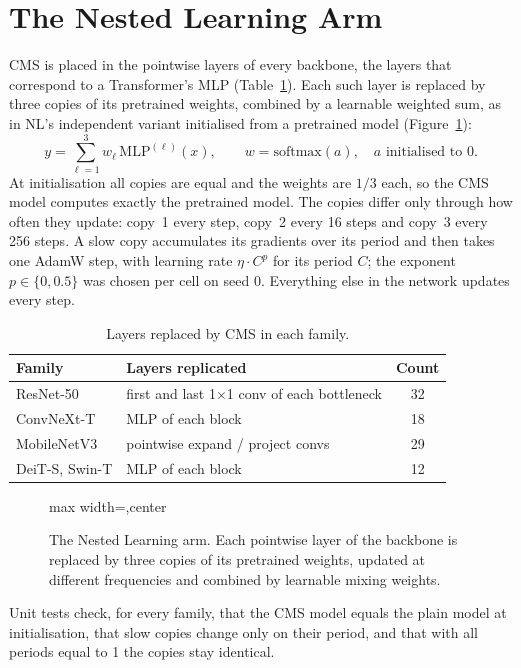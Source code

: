 \documentclass[12pt,a4paper]{report}
\newcommand{\diagram}[1]{\begin{adjustbox}{max width=\textwidth,center}\end{adjustbox}}
\begin{document}
\section{The Nested Learning Arm}\label{sec:cms}
CMS is placed in the pointwise layers of every backbone, the layers that correspond to a Transformer's MLP (Table~\ref{tab:cmslayers}). Each such layer is replaced by three copies of its pretrained weights, combined by a learnable weighted sum, as in NL's independent variant initialised from a pretrained model (Figure~\ref{fig:cmslayer}):
\begin{equation}
y = \sum_{\ell=1}^{3} w_\ell \, \mathrm{MLP}^{(\ell)}(x), \qquad w = \mathrm{softmax}(a), \quad a \text{ initialised to } 0.
\end{equation}
At initialisation all copies are equal and the weights are $1/3$ each, so the CMS model computes exactly the pretrained model. The copies differ only through how often they update: copy~1 every step, copy~2 every 16 steps and copy~3 every 256 steps. A slow copy accumulates its gradients over its period and then takes one AdamW step, with learning rate $\eta \cdot C^{p}$ for its period $C$; the exponent $p \in \{0, 0.5\}$ was chosen per cell on seed 0. Everything else in the network updates every step.

\begin{table}[H]
\centering
\small
\caption{Layers replaced by CMS in each family.}
\label{tab:cmslayers}
\begin{tabular}{|l|l|c|}
\hline
\textbf{Family} & \textbf{Layers replicated} & \textbf{Count} \\
\hline
ResNet-50 & first and last 1$\times$1 conv of each bottleneck & 32 \\
ConvNeXt-T & MLP of each block & 18 \\
MobileNetV3 & pointwise expand / project convs & 29 \\
DeiT-S, Swin-T & MLP of each block & 12 \\
\hline
\end{tabular}
\end{table}

\begin{figure}[H]
\centering
\diagram{cms_layer}
\caption{The Nested Learning arm. Each pointwise layer of the backbone is replaced by three copies of its pretrained weights, updated at different frequencies and combined by learnable mixing weights.}
\label{fig:cmslayer}
\end{figure}

Unit tests check, for every family, that the CMS model equals the plain model at initialisation, that slow copies change only on their period, and that with all periods equal to 1 the copies stay identical.
\end{document}
